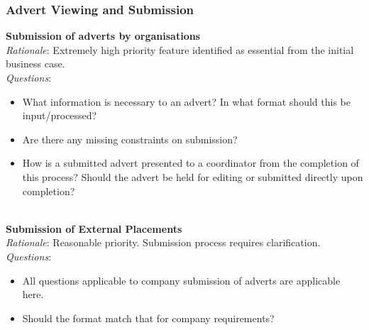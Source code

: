 \documentclass{l3deliverable}
\begin{document}
\subsubsection{Advert Viewing and Submission}
\textbf{Submission of adverts by organisations}\\
\emph{Rationale}: Extremely high priority feature identified as essential from the initial business case.\\
\emph{Questions}:
\begin{itemize}
\item{What information is necessary to an advert? In what format should this be input/processed?}
\item{Are there any missing constraints on submission?}
\item{How is a submitted advert presented to a coordinator from the completion of this process? Should the advert be held for editing or submitted directly upon completion?}
\end{itemize}
\\

\textbf{Submission of External Placements}\\
\emph{Rationale}: Reasonable priority. Submission process requires clarification.\\
\emph{Questions}:
\begin{itemize}
\item{All questions applicable to company submission of adverts are applicable here.}
\item{Should the format match that for company requirements?}
\end{itemize}
\\
\end{document}
